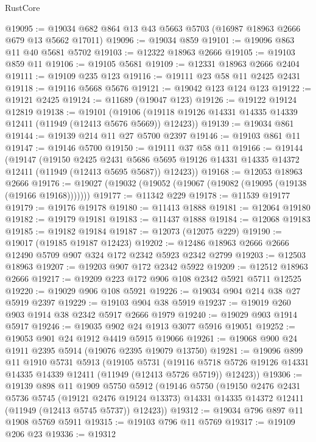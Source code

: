 \begin{lexlean}{RustCore}
\begin{coremodule}
@19095 := @19034 @682 @864 @13 @43 @5663 @5703 (@16987 @18963 @2666 @679 @13 @5662 @17011)
@19096 := @19034 @859
@19101 := @19096 @863 @11 @40 @5681 @5702
@19103 := @12322 @18963 @2666
@19105 := @19103 @859 @11
@19106 := @19105 @5681
@19109 := @12331 @18963 @2666 @2404
@19111 := @19109 @235 @123
@19116 := @19111 @23 @58 @11 @2425 @2431
@19118 := @19116 @5668 @5676
@19121 := @19042 @123 @124 @123
@19122 := @19121 @2425
@19124 := @11689 (@19047 @123)
@19126 := @19122 @19124 @12819
@19138 := @19101
    (@19106 (@19118 @19126 @14331 @14335 @14339 @12411 (@11949 (@12413 @5676 @5669)) @12423))
@19139 := @19034 @861
@19144 := @19139 @214 @11 @27 @5700 @2397
@19146 := @19103 @861 @11
@19147 := @19146 @5700
@19150 := @19111 @37 @58 @11
@19166 := @19144
    (@19147
      (@19150
        @2425
        @2431
        @5686
        @5695
        @19126
        @14331
        @14335
        @14372
        @12411
        (@11949 (@12413 @5695 @5687))
        @12423))
@19168 := @12053 @18963 @2666
@19176 := @19027 (@19032 (@19052 (@19067 (@19082 (@19095 (@19138 (@19166 @19168)))))))
@19177 := @11342 @229
@19178 := @11539 @19177
@19179 := @19176 @19178
@19180 := @11413 @1888
@19181 := @12064 @19180
@19182 := @19179 @19181
@19183 := @11437 @1888
@19184 := @12068 @19183
@19185 := @19182 @19184
@19187 := @12073 (@12075 @229)
@19190 := @19017 (@19185 @19187 @12423)
@19202 := @12486 @18963 @2666 @2666 @12490 @5709 @907 @324 @172 @2342 @5923 @2342 @2799
@19203 := @12503 @18963
@19207 := @19203 @907 @172 @2342 @5922
@19209 := @12512 @18963 @2666
@19217 := @19209 @223 @172 @906 @108 @2342 @5921 @5711 @12525
@19220 := @19029 @906 @108 @5921
@19226 := @19034 @904 @214 @38 @27 @5919 @2397
@19229 := @19103 @904 @38 @5919
@19237 := @19019 @260 @903 @1914 @38 @2342 @5917 @2666 @1979
@19240 := @19029 @903 @1914 @5917
@19246 := @19035 @902 @24 @1913 @3077 @5916 @19051
@19252 := @19053 @901 @24 @1912 @4419 @5915 @19066
@19261 := @19068 @900 @24 @1911 @2395 @5914 (@19076 @2395 @19079 @13750)
@19281 := @19096
    @899
    @11
    @1910
    @5731
    @5913
    (@19105
      @5731
      (@19116 @5718 @5726 @19126 @14331 @14335 @14339 @12411 (@11949 (@12413 @5726 @5719)) @12423))
@19306 := @19139
    @898
    @11
    @1909
    @5750
    @5912
    (@19146
      @5750
      (@19150
        @2476
        @2431
        @5736
        @5745
        (@19121 @2476 @19124 @13373)
        @14331
        @14335
        @14372
        @12411
        (@11949 (@12413 @5745 @5737))
        @12423))
@19312 := @19034 @796 @897 @11 @1908 @5769 @5911
@19315 := @19103 @796 @11 @5769
@19317 := @19109 @206 @23
@19336 := @19312

\end{coremodule}
\end{lexlean}
